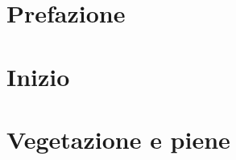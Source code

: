 \documentclass[12pt,a4paper,italian,twoside]{scrbook}
\begin{document}
\frontmatter


\tableofcontents
\listoffigures
\listoftables
\chapter{Prefazione}




\mainmatter
\chapter{Inizio}




\chapter{Vegetazione e piene}





\glsaddall
\backmatter

\manualmark
\markboth{\spacedlowsmallcaps{\glossaryname}}%
{\spacedlowsmallcaps{\glossaryname}}
\pagestyle{scrheadings}
\printglossaries

\printbibliography
\end{document}
